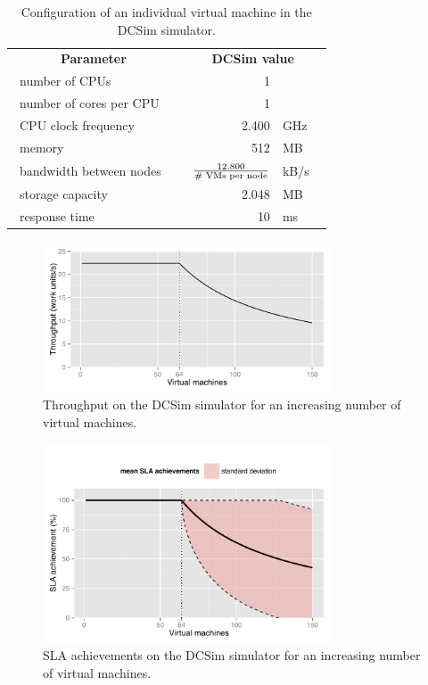 \documentclass[conference, 10pt]{IEEEtran}
\begin{document}
\begin{table}
	\renewcommand{\arraystretch}{1.3}
	\caption{Configuration of an individual virtual machine in the DCSim simulator.}
	\label{dcsim:vm}
	\begin{center}
	\tabcolsep=0.05cm
	\begin{tabular}{|l|rl|}
		\hline
		 \multicolumn{1}{|c|}{\multirow{2}{*}{\textbf{Parameter}}} & \multicolumn{2}{c|}{\multirow{2}{*}{\textbf{\ DCSim value\ }}} \\
		&& \\
		\hline
		\ number of CPUs& 1 & \\
		\ number of cores per CPU\ \ & 1& \\
		\ CPU clock frequency& 2.400&GHz\ \ \\
		\ memory& 512 &MB\\
		\ bandwidth between nodes\ \ &\ $\frac{12.800}{\tiny \textrm{\# VMs per node}}$&kB/s\\
		\ storage capacity & \  2.048& MB \\
		\ response time \ &10&ms\\
		\hline
	\end{tabular}
	\end{center}
\end{table}


\begin{figure}
\centering
\includegraphics[width=3.4in]{includes/DCSim_throughput}
\caption{Throughput on the DCSim simulator for an increasing number of virtual machines.\protect\footnotemark}
\label{fig:dcsim:throughput}
\end{figure}

\begin{figure}
\centering
\includegraphics[width=3.4in]{includes/DCSim_SLA}
\caption{SLA achievements on the DCSim simulator for an increasing number of virtual machines.}
\label{fig:dcsim:sla}
\end{figure}
\end{document}
